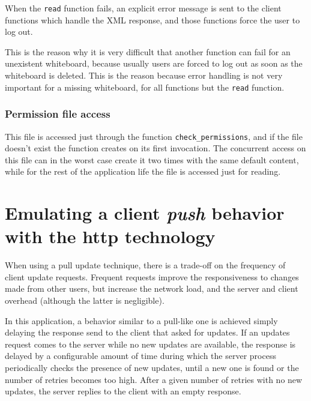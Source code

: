 \documentclass[10pt,a4paper,english]{book}
\begin{document}
When the \texttt{read} function fails, an explicit error message is sent to
the client functions which handle the XML response, and those
functions force the user to log out.

This is the reason why it is very difficult that another function can
fail for an unexistent whiteboard, because usually users are forced to
log out as soon as the whiteboard is deleted. This is the reason
because error handling is not very important for a missing whiteboard,
for all functions but the \texttt{read} function.



\hypertarget{permission-file-access}{}
\subsubsection{Permission file access}
\label{permission-file-access}

This file is accessed just through the function \texttt{check{\_}permissions},
and if the file doesn't exist the function creates on its first
invocation. The concurrent access on this file can in the worst case
create it two times with the same default content, while for the rest
of the application life the file is accessed just for reading.



\hypertarget{emulating-a-client-push-behavior-with-the-http-technology}{}
\section{Emulating a client \emph{push} behavior with the http technology}
\label{emulating-a-client-push-behavior-with-the-http-technology}

When using a pull update technique, there is a trade-off on the
frequency of client update requests. Frequent requests improve the
responsiveness to changes made from other users, but increase the
network load, and the server and client overhead (although the latter
is negligible).

In this application, a behavior similar to a pull-like one is achieved
simply delaying the response send to the client that asked for
updates. If an updates request comes to the server while no new
updates are available, the response is delayed by a configurable
amount of time during which the server process periodically checks the
presence of new updates, until a new one is found or the number of
retries becomes too high. After a given number of retries with no new
updates, the server replies to the client with an empty response.
\end{document}
